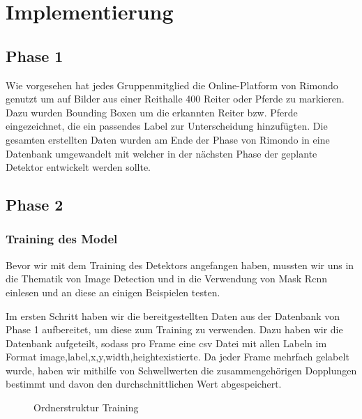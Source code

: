 \chapter{Implementierung}
\label{ch:implementierung}

\section{Phase 1}
Wie vorgesehen hat jedes Gruppenmitglied die Online-Platform von Rimondo genutzt um auf Bilder aus einer Reithalle 400 Reiter oder Pferde zu markieren. Dazu wurden Bounding Boxen um  die erkannten Reiter bzw. Pferde eingezeichnet, die ein passendes Label zur Unterscheidung hinzufügten. Die gesamten erstellten Daten wurden am Ende der Phase von Rimondo in eine Datenbank umgewandelt mit welcher in der nächsten Phase der geplante Detektor entwickelt werden sollte.

\section{Phase 2}
\subsection*{Training des Model}
Bevor wir mit dem Training des Detektors angefangen haben, mussten wir uns in die Thematik von Image Detection und in die Verwendung von Mask Rcnn einlesen und an diese an einigen Beispielen testen. 


Im ersten Schritt haben wir die bereitgestellten Daten aus der Datenbank von Phase 1 aufbereitet, um diese zum Training zu verwenden. Dazu haben wir die Datenbank aufgeteilt, sodass pro Frame eine csv Datei mit allen Labeln im Format \dq image,label,x,y,width,height\dq existierte. Da jeder Frame mehrfach gelabelt wurde, haben wir mithilfe von Schwellwerten die zusammengehörigen Dopplungen bestimmt und davon den durchschnittlichen Wert abgespeichert. 

\begin{figure}
\caption{Ordnerstruktur Training}
\label{fig:folderstructure}
\end{figure}

